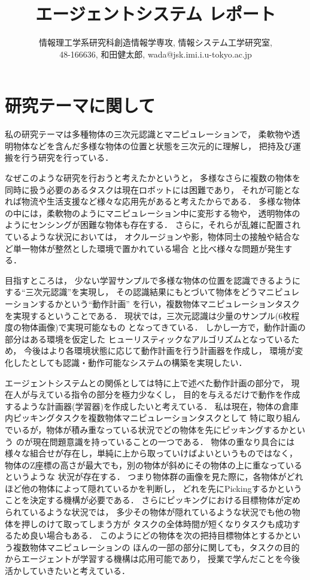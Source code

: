 \documentclass[letterpaper, 12 pt, conference, onecolumn]{ieeeconf}  %
\title{\LARGE \bf
エージェントシステム レポート
}
\author{情報理工学系研究科創造情報学専攻, 情報システム工学研究室, \\
        48-166636, 和田健太郎, wada@jsk.imi.i.u-tokyo.ac.jp}
\begin{document}
\maketitle
\thispagestyle{empty}
\pagestyle{empty}

\section{研究テーマに関して}

私の研究テーマは多種物体の三次元認識とマニピュレーションで，
柔軟物や透明物体などを含んだ多様な物体の位置と状態を三次元的に理解し，
把持及び運搬を行う研究を行っている．

なぜこのような研究を行おうと考えたかというと，
多様なさらに複数の物体を同時に扱う必要のあるタスクは現在ロボットには困難であり，
それが可能となれば物流や生活支援など様々な応用先があると考えたからである．
多様な物体の中には，柔軟物のようにマニピュレーション中に変形する物や，
透明物体のようにセンシングが困難な物体も存在する．
さらに，それらが乱雑に配置されているような状況においては，
オクルージョンや影，物体同士の接触や結合など単一物体が整然とした環境で置かれている場合
と比べ様々な問題が発生する．

目指すところは，
少ない学習サンプルで多様な物体の位置を認識できるようにする``三次元認識''を実現し，
その認識結果にもとづいて物体をどうマニピュレーションするかという``動作計画''
を行い，複数物体マニピュレーションタスクを実現するということである．
現状では，三次元認識は少量のサンプル(6枚程度の物体画像)で実現可能なもの
となってきている．
しかし一方で，動作計画の部分はある環境を仮定した
ヒューリスティックなアルゴリズムとなっているため，
今後はより各環境状態に応じて動作計画を行う計画器を作成し，
環境が変化したとしても認識・動作可能なシステムの構築を実現したい．

エージェントシステムとの関係としては特に上で述べた動作計画の部分で，
現在人が与えている指令の部分を極力少なくし，
目的を与えるだけで動作を作成するような計画器(学習器)を作成したいと考えている．
私は現在，物体の倉庫内ピッキングタスクを複数物体マニピュレーションタスクとして
特に取り組んでいるが，物体が積み重なっている状況でどの物体を先にピッキングするかという
のが現在問題意識を持っていることの一つである．
物体の重なり具合には様々な組合せが存在し，単純に上から取っていけばよいというものではなく，
物体のZ座標の高さが最大でも，別の物体が斜めにその物体の上に重なっているというような
状況が存在する．
つまり物体群の画像を見た際に，各物体がどれほど他の物体によって隠れているかを判断し，
どれを先にPickingするかということを決定する機構が必要である．
さらにピッキングにおける目標物体が定められているような状況では，
多少その物体が隠れているような状況でも他の物体を押しのけて取ってしまう方が
タスクの全体時間が短くなりタスクも成功するため良い場合もある．
このようにどの物体を次の把持目標物体とするかという複数物体マニピュレーションの
ほんの一部の部分に関しても，タスクの目的からエージェントが学習する機構は応用可能であり，
授業で学んだことを今後活かしていきたいと考えている．　　
\end{document}

